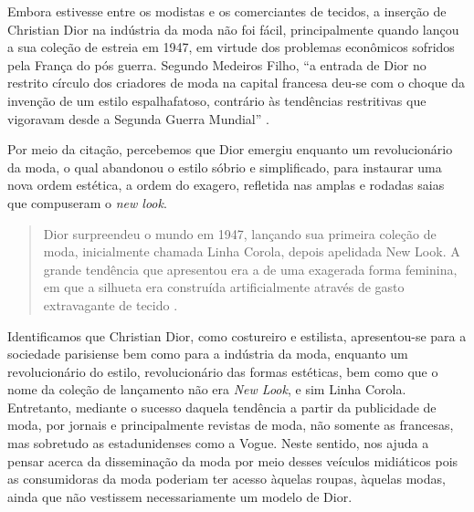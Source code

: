 \begin{refsection}
    Embora estivesse entre os modistas e os comerciantes de tecidos, a inserção de Christian Dior na indústria da moda não foi fácil, principalmente quando lançou a sua coleção de estreia em 1947, em virtude dos problemas econômicos sofridos pela França do pós guerra. Segundo Medeiros Filho, ``a entrada de Dior no restrito círculo dos criadores de moda na capital francesa deu-se com o choque da invenção de um estilo espalhafatoso, contrário às tendências restritivas que vigoravam desde a Segunda Guerra Mundial'' \citeyear[p.~115]{MedeirosFl2014Arremedando}.

    Por meio da citação, percebemos que Dior emergiu enquanto um revolucionário da moda, o qual abandonou o estilo sóbrio e simplificado, para instaurar uma nova ordem estética, a ordem do exagero, refletida nas amplas e rodadas saias que compuseram o \textit{new look}.

    \begin{quotation}
        Dior surpreendeu o mundo em 1947, lançando sua primeira coleção de moda, inicialmente chamada Linha Corola, depois apelidada New Look. A grande tendência que apresentou era a de uma exagerada forma feminina, em que a silhueta era construída artificialmente através de gasto extravagante de tecido \cite[p.~115]{MedeirosFl2014Arremedando}. 
    \end{quotation}

    Identificamos que Christian Dior, como costureiro e estilista, apresentou-se para a sociedade parisiense bem como para a indústria da moda, enquanto um revolucionário do estilo, revolucionário das formas estéticas, bem como que o nome da coleção de lançamento não era \textit{New Look}, e sim Linha Corola. Entretanto, mediante o sucesso daquela tendência a partir da publicidade de moda, por jornais e principalmente revistas de moda, não somente as francesas, mas sobretudo as estadunidenses como a Vogue. Neste sentido, \textcite{Crane2006Moda} nos ajuda a pensar acerca da disseminação da moda por meio desses veículos midiáticos pois as consumidoras da moda poderiam ter acesso àquelas roupas, àquelas modas, ainda que não vestissem necessariamente um modelo de Dior.


\end{refsection}
